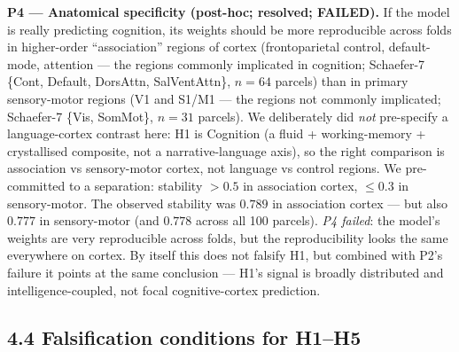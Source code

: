 \documentclass[11pt,letterpaper]{report}
\begin{document}
\textbf{P4 --- Anatomical specificity (post-hoc; resolved; FAILED).} If the model is really predicting cognition, its weights should be more reproducible across folds in higher-order ``association'' regions of cortex (frontoparietal control, default-mode, attention --- the regions commonly implicated in cognition; Schaefer-7 \{Cont, Default, DorsAttn, SalVentAttn\}, $n = 64$ parcels) than in primary sensory-motor regions (V1 and S1/M1 --- the regions not commonly implicated; Schaefer-7 \{Vis, SomMot\}, $n = 31$ parcels). We deliberately did \emph{not} pre-specify a language-cortex contrast here: H1 is Cognition (a fluid + working-memory + crystallised composite, not a narrative-language axis), so the right comparison is association vs sensory-motor cortex, not language vs control regions. We pre-committed to a separation: stability $> 0.5$ in association cortex, $\le 0.3$ in sensory-motor. The observed stability was $0.789$ in association cortex --- but also $0.777$ in sensory-motor (and $0.778$ across all 100 parcels). \emph{P4 failed}: the model's weights are very reproducible across folds, but the reproducibility looks the same everywhere on cortex. By itself this does not falsify H1, but combined with P2's failure it points at the same conclusion --- H1's signal is broadly distributed and intelligence-coupled, not focal cognitive-cortex prediction.

\subsection*{4.4 Falsification conditions for H1--H5}
\end{document}
